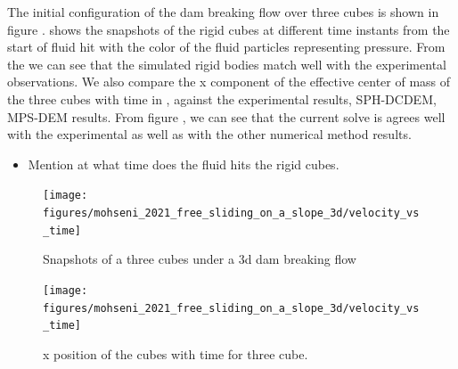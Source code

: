 \documentclass[preprint,12pt]{elsarticle}
\begin{document}
The initial configuration of the dam breaking flow over three cubes is shown
in figure .
 shows the snapshots of
the rigid cubes at different time instants from the start of fluid hit with
the color of the fluid particles representing pressure. From the
 we can see that the
simulated rigid bodies match well with the experimental observations. We also
compare the x component of the effective center of mass of the three cubes
with time in , against
the experimental results, SPH-DCDEM, MPS-DEM results. From figure
, we can see that the
current solve is agrees well with the experimental as well as with the other
numerical method results.
\begin{itemize}
\item Mention at what time does the fluid hits the rigid cubes.
\end{itemize}
\begin{figure}[!htpb]
  \centering
  \texttt{[image: figures/mohseni\_2021\_free\_sliding\_on\_a\_slope\_3d/velocity\_vs\_time]}
  \caption{Snapshots of a three cubes under a 3d dam breaking flow}
\label{fig:snapshots-three-cubes-3d-dam-breaking-flow}
\end{figure}
\begin{figure}[!htpb]
  \centering
  \texttt{[image: figures/mohseni\_2021\_free\_sliding\_on\_a\_slope\_3d/velocity\_vs\_time]}
  \caption{x position of the cubes with time for three cube.}
\label{fig:x-position-three-cubes-3d-dam-breaking-flow}
\end{figure}
\end{document}
